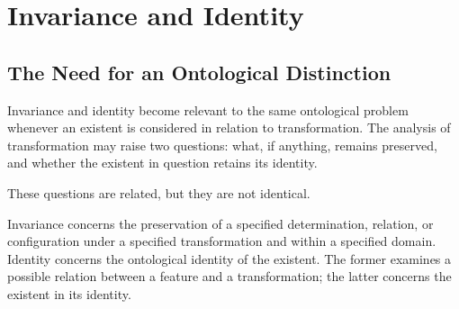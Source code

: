 %
%
%
%
%

\section{Invariance and Identity}
\label{sec:invariance-and-identity}

\subsection{The Need for an Ontological Distinction}

Invariance and identity become relevant to the same
ontological problem whenever an existent is considered
in relation to transformation. The analysis of
transformation may raise two questions: what, if
anything, remains preserved, and whether the existent
in question retains its identity.

These questions are related, but they are not identical.

Invariance concerns the preservation of a specified
determination, relation, or configuration under a
specified transformation and within a specified domain.
Identity concerns the ontological identity of the
existent. The former examines a possible relation
between a feature and a transformation; the latter
concerns the existent in its identity.

